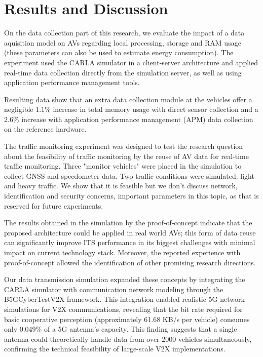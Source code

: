\chapter{Results and Discussion}

On the data collection part of this research, we evaluate the impact of a data aquisition model on AVs regarding local processing, storage and RAM usage (these parameters can also be used to estimate energy consumption). The experiment used the CARLA simulator in a client-server architecture and applied real-time data collection directly from the simulation server, as well as using application performance management tools.

Resulting data show that an extra data collection module at the vehicles offer a negligible 1.1\% increase in total memory usage  with direct sensor collection and a 2.6\% increase with application performance management (APM) data collection on the reference hardware.

The traffic monitoring experiment was designed to test the research question about the feasibility of traffic monitoring by the reuse of AV data for real-time traffic monitoring. Three "monitor vehicles" were placed in the simulation to collect GNSS and speedometer data. Two traffic conditions were simulated: light and heavy traffic. We show that it is feasible but we don't discuss network, identification and security concerns, important parameters in this topic, as that is reserved for future experiments.

The results obtained in the simulation by the proof-of-concept indicate that the proposed architecture could be applied in real world AVs; this form of data reuse can significantly improve ITS performance in its biggest challenges with minimal impact on current technology stack. Moreover, the reported experience with proof-of-concept allowed the identification of other promising research directions.

Our data transmission simulation expanded these concepts by integrating the CARLA simulator with communication network modeling through the B5GCyberTestV2X framework. This integration enabled realistic 5G network simulations for V2X communications, revealing that the bit rate required for basic cooperative perception (approximately 61.68 KB/s per vehicle) consumes only 0.049\% of a 5G antenna's capacity. This finding suggests that a single antenna could theoretically handle data from over 2000 vehicles simultaneously, confirming the technical feasibility of large-scale V2X implementations.

